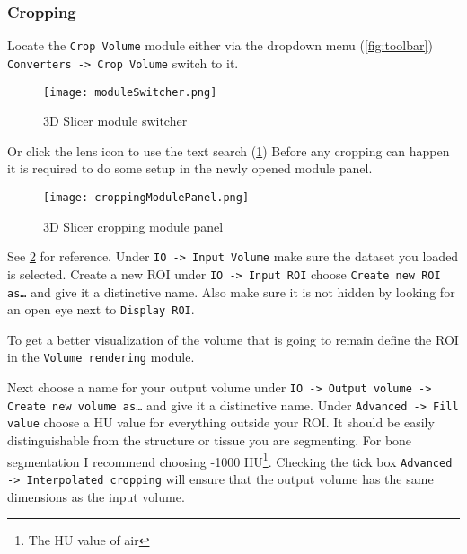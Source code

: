 \subsubsection{Cropping}\label{section:crop}
Locate the \texttt{Crop Volume} module either via the dropdown menu (\cref{fig:toolbar}) \texttt{Converters -> Crop Volume} switch to it.
\begin{figure}[h!]
	\centerline{
		\texttt{[image: moduleSwitcher.png]}}
	\caption{3D Slicer module switcher}\label{fig:mS}
\end{figure}
Or click the lens icon to use the text search (\cref{fig:mS})
Before any cropping can happen it is required to do some setup in the newly opened module panel.
\newline
\begin{figure}[h!]
	\centerline{
		\texttt{[image: croppingModulePanel.png]}}
	\caption{3D Slicer cropping module panel}\label{fig:cMP}
\end{figure}
\newline
\noindent
See \cref{fig:cMP} for reference.
Under \texttt{IO -> Input Volume} make sure the dataset you loaded is selected.
Create a new ROI under \texttt{IO -> Input ROI} choose \texttt{Create new ROI as\ldots} and give it a distinctive name. Also make sure it is not hidden by looking for an open eye next to \texttt{Display ROI}.
\newline %
\newline %
\begin{minipage}{0.4\textwidth}
	\begin{center}
		
	\end{center}
\end{minipage}%
%
\begin{minipage}{0.5\textwidth}
	To get a better visualization of the volume that is going to remain define the ROI in the \texttt{Volume rendering} module.
\end{minipage}
\newline
\noindent
Next choose a name for your output volume under \texttt{IO -> Output volume -> Create new volume as\ldots} and give it a distinctive name.
Under \texttt{Advanced -> Fill value} choose a HU value for everything outside your ROI. It should be easily distinguishable from the structure or tissue you are segmenting. For bone segmentation I recommend choosing -1000 HU\footnote{The HU value of air}. Checking the tick box \texttt{Advanced -> Interpolated cropping} will ensure that the output volume has the same dimensions as the input volume.
